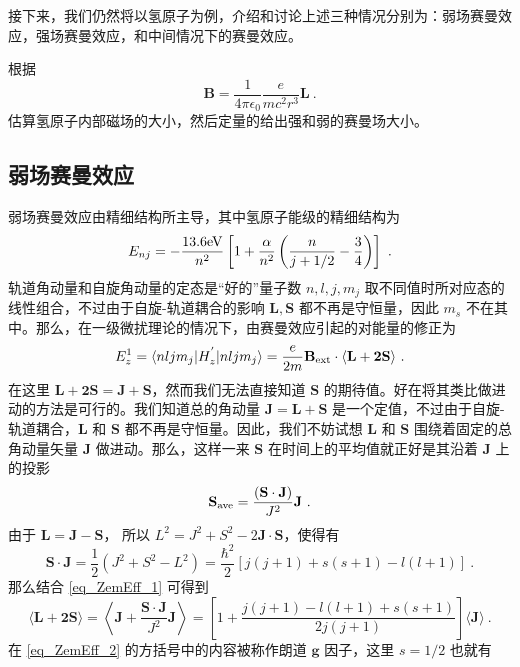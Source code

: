 接下来，我们仍然将以氢原子为例，介绍和讨论上述三种情况分别为：弱场赛曼效应，强场赛曼效应，和中间情况下的赛曼效应。
\begin{exercise}{}
根据
\begin{equation}\label{eq_ZemEff_17}
\mathbf{B}=\frac{1}{4\pi\epsilon_0}\frac{e}{mc^2r^3}\mathbf{L}~.
\end{equation}
估算氢原子内部磁场的大小，然后定量的给出强和弱的赛曼场大小。
\end{exercise}
\subsection{弱场赛曼效应}
弱场赛曼效应由精细结构所主导，其中氢原子能级的精细结构为
\begin{equation}\label{eq_ZemEff_3}
E_{nj}=-\frac{13.6\rm{eV}}{n^2}\left[1+\frac{\alpha}{n^2}\left(\frac{n}{j+1/2}-\frac{3}{4}\right)\right]~.
\end{equation}
轨道角动量和自旋角动量的定态是“好的”量子数 $n,l,j,m_j$ 取不同值时所对应态的线性组合，不过由于自旋-轨道耦合的影响 $\mathbf{L,S}$ 都不再是守恒量，因此 $m_s$ 不在其中。那么，在一级微扰理论的情况下，由赛曼效应引起的对能量的修正为
$$
E_z^{1}=\langle nljm_j|H_z^{'}|nljm_j\rangle=\frac{e}{2m}\mathbf{B}_{\rm{ext}}\cdot\langle\mathbf{L+2S}\rangle~.
$$
在这里 $\mathbf{L+2S=J+S}$，然而我们无法直接知道 $\mathbf{S}$ 的期待值。好在将其类比做进动的方法是可行的。我们知道总的角动量 $\mathbf{J=L+S}$ 是一个定值，不过由于自旋-轨道耦合，$\mathbf{L}$ 和 $\mathbf{S}$ 都不再是守恒量。因此，我们不妨试想 $\mathbf{L}$ 和 $\mathbf{S}$ 围绕着固定的总角动量矢量 $\mathbf{J}$ 做进动。那么，这样一来 $\mathbf{S}$ 在时间上的平均值就正好是其沿着 $\mathbf{J}$ 上的投影
\begin{equation}\label{eq_ZemEff_1}
\mathbf{S}_{\rm{ave}}=\frac{(\mathbf{S\cdot J})}{J^2}\mathbf{J}~.
\end{equation}
由于 $\mathbf{L=J-S}$， 所以 $L^2=J^2+S^2-2\mathbf{J\cdot S}$，使得有
\begin{equation}
\mathbf{S\cdot J}=\frac{1}{2}(J^2+S^2-L^2)=\frac{\hbar^2}{2}[j(j+1)+s(s+1)-l(l+1)]~.
\end{equation}
那么结合 \autoref{eq_ZemEff_1} 可得到
\begin{equation}\label{eq_ZemEff_2}
\langle \mathbf{L+2S}\rangle =\left\langle \mathbf{J}+\frac{\mathbf{S\cdot J}}{J^2}\mathbf{J}\right\rangle=\left[1+\frac{j(j+1)-l(l+1)+s(s+1)}{2j(j+1)}\right]\langle\mathbf{J}\rangle~.
\end{equation}
在 \autoref{eq_ZemEff_2} 的方括号中的内容被称作朗道 $\mathbf{g}$ 因子，这里 $s=1/2$ 也就有
